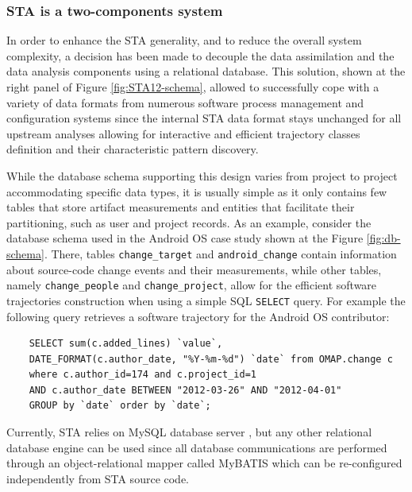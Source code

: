 \subsubsection{STA is a two-components system}\label{two_components}
In order to enhance the STA generality, and to reduce the overall system complexity, a decision has been made to decouple the data assimilation and the data analysis components using a relational database. This solution, shown at the right panel of Figure \ref{fig:STA12-schema}, allowed to successfully cope with a variety of data formats from numerous software process management and configuration systems since the internal STA data format stays unchanged for all upstream analyses allowing for interactive and efficient trajectory classes definition and their characteristic pattern discovery. 

While the database schema supporting this design varies from project to project accommodating specific data types, it is usually simple as it only contains few tables that store artifact measurements and entities that facilitate their partitioning, such as user and project records. As an example, consider the database schema used in the Android OS case study shown at the Figure \ref{fig:db-schema}. There, tables \texttt{change\_target} and \texttt{android\_change} contain information about source-code change events and their measurements, while other tables, namely \texttt{change\_people} and \texttt{change\_project}, allow for the efficient software trajectories construction when using a simple SQL \texttt{SELECT} query. For example the following query retrieves a software trajectory for the Android OS contributor: 
\begin{verbatim}
    SELECT sum(c.added_lines) `value`, 
    DATE_FORMAT(c.author_date, "%Y-%m-%d") `date` from OMAP.change c
    where c.author_id=174 and c.project_id=1
    AND c.author_date BETWEEN "2012-03-26" AND "2012-04-01"
    GROUP by `date` order by `date`;
\end{verbatim}

Currently, STA relies on MySQL database server \cite{mysql}, but any other relational database engine can be used since all database communications are performed through an object-relational mapper called MyBATIS \cite{mybatis} which can be re-configured independently from STA source code.


